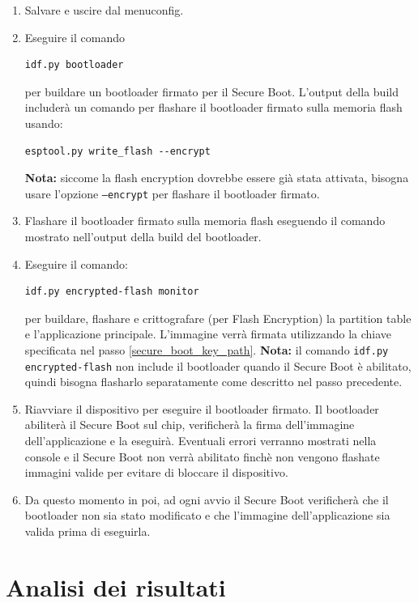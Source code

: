 \documentclass[a4paper]{article}
\begin{document}
\begin{enumerate}
  \item Salvare e uscire dal menuconfig.

  \item Eseguire il comando
\begin{lstlisting}
idf.py bootloader
\end{lstlisting}
    per buildare un bootloader firmato per il Secure Boot. L'output della build
    includerà un comando per flashare il bootloader firmato sulla memoria flash
    usando:
\begin{lstlisting}
esptool.py write_flash --encrypt
\end{lstlisting}
    \textbf{Nota:} siccome la flash encryption dovrebbe essere già stata attivata,
    bisogna usare l'opzione \texttt{--encrypt} per flashare il bootloader firmato.

  \item Flashare il bootloader firmato sulla memoria flash eseguendo il comando
    mostrato nell'output della build del bootloader.

  \item Eseguire il comando:
\begin{lstlisting}
idf.py encrypted-flash monitor
\end{lstlisting}
    per buildare, flashare e crittografare (per Flash Encryption) la partition table e
    l'applicazione principale. L'immagine verrà firmata utilizzando la chiave specificata
    nel passo \ref{secure_boot_key_path}. \textbf{Nota:} il comando
    \texttt{idf.py encrypted-flash} non include il bootloader quando il Secure Boot è
    abilitato, quindi bisogna flasharlo separatamente come descritto nel passo precedente.

  \item Riavviare il dispositivo per eseguire il bootloader firmato. Il bootloader
    abiliterà il Secure Boot sul chip, verificherà la firma dell'immagine
    dell'applicazione e la eseguirà. Eventuali errori verranno mostrati nella
    console e il Secure Boot non verrà abilitato finchè non vengono flashate
    immagini valide per evitare di bloccare il dispositivo.

  \item Da questo momento in poi, ad ogni avvio il Secure Boot verificherà che
    il bootloader non sia stato modificato e che l'immagine dell'applicazione
    sia valida prima di eseguirla.
\end{enumerate}

\section{Analisi dei risultati}
\end{document}
